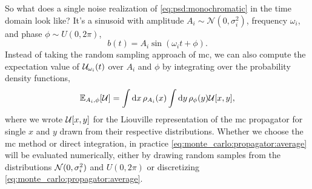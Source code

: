 So what does a single noise realization of \cref{eq:psd:monochromatic} in the time domain look like? 
It's a sinusoid with amplitude $A_i \sim \mathcal{N}(0, \sigma_i^2)$, frequency $\omega_i$, and phase $\phi \sim U(0, 2\pi)$,
\begin{equation}
    b(t) = A_i\sin(\omega_i t + \phi).
\end{equation}
Instead of taking the random sampling approach of \gls{mc}, we can also compute the expectation value of $\mathcal{U}_{\omega_i}(t)$ over $A_i$ and $\phi$ by integrating over the probability density functions,
\begin{equation}
    \label{eq:monte_carlo:propagator:average}
    \mathbb{E}_{A_i,\phi}[\mathcal{U}] = \int\dd{x}\rho_{A_i}(x)\int\dd{y}\rho_{\phi}(y)\mathcal{U}[x, y],
\end{equation}
where we wrote $\mathcal{U}[x, y]$ for the Liouville representation of the \gls{mc} propagator for single $x$ and $y$ drawn from their respective distributions.
Whether we choose the \gls{mc} method or direct integration, in practice \cref{eq:monte_carlo:propagator:average} will be evaluated numerically, either by drawing random samples from the distributions $\mathcal{N}(0, \sigma_i^2)$ and $U(0,2\pi)$ or discretizing \cref{eq:monte_carlo:propagator:average}.
